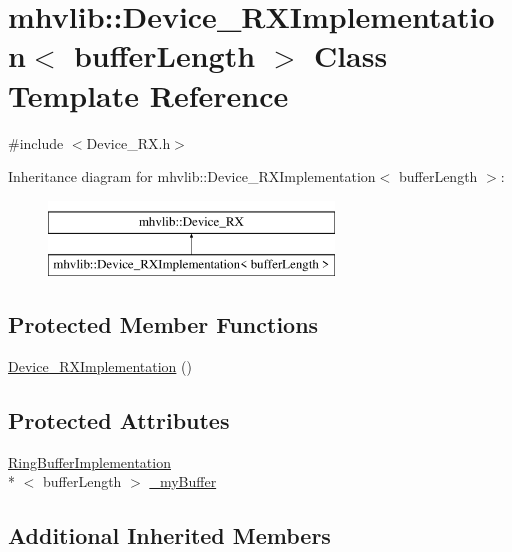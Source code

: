 \hypertarget{classmhvlib_1_1_device___r_x_implementation}{\section{mhvlib\-:\-:Device\-\_\-\-R\-X\-Implementation$<$ buffer\-Length $>$ Class Template Reference}
\label{classmhvlib_1_1_device___r_x_implementation}
}


{\ttfamily \#include $<$Device\-\_\-\-R\-X.\-h$>$}

Inheritance diagram for mhvlib\-:\-:Device\-\_\-\-R\-X\-Implementation$<$ buffer\-Length $>$\-:\begin{figure}[H]
\begin{center}
\leavevmode
\includegraphics[height=2.000000cm]{classmhvlib_1_1_device___r_x_implementation}
\end{center}
\end{figure}
\subsection*{Protected Member Functions}
\begin{DoxyCompactItemize}
\item 
\hyperlink{classmhvlib_1_1_device___r_x_implementation_a59a7b2a62efe437aa6b5501c0089eea4}{Device\-\_\-\-R\-X\-Implementation} ()
\end{DoxyCompactItemize}
\subsection*{Protected Attributes}
\begin{DoxyCompactItemize}
\item 
\hyperlink{classmhvlib_1_1_ring_buffer_implementation}{Ring\-Buffer\-Implementation}\\*
$<$ buffer\-Length $>$ \hyperlink{classmhvlib_1_1_device___r_x_implementation_a6ea6a7a142d91f6b3cb4814313ef8abb}{\-\_\-my\-Buffer}
\end{DoxyCompactItemize}
\subsection*{Additional Inherited Members}



